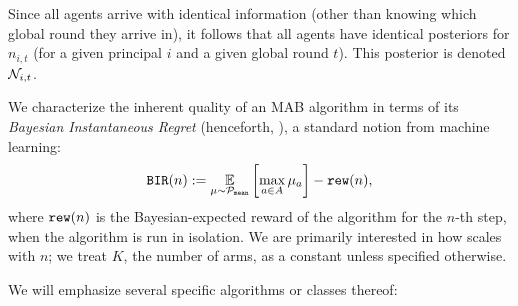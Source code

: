 Since all agents arrive with identical information (other than knowing which global round they arrive in), it follows that all agents have identical posteriors for $n_{i,t}$ (for a given principal $i$ and a given global round $t$). This posterior is denoted $\mathcal{N}_{i,t}$.



We characterize the inherent quality of an MAB algorithm in terms of its \emph{Bayesian Instantaneous Regret} (henceforth, \BIR), a standard notion from machine learning:
\begin{align}
\BIR(n) := \E_{\mu\sim\priorMu}
    \left[ \max_{a\in A} \mu_a\right] - \rew(n),
\end{align}
where $\mathtt{rew}(n)$ is the Bayesian-expected reward of the algorithm for the $n$-th step, when the algorithm is run in isolation. We are primarily interested in how \BIR scales with $n$; we treat $K$, the number of arms, as a constant unless specified otherwise.

We will emphasize several specific algorithms or classes thereof:


